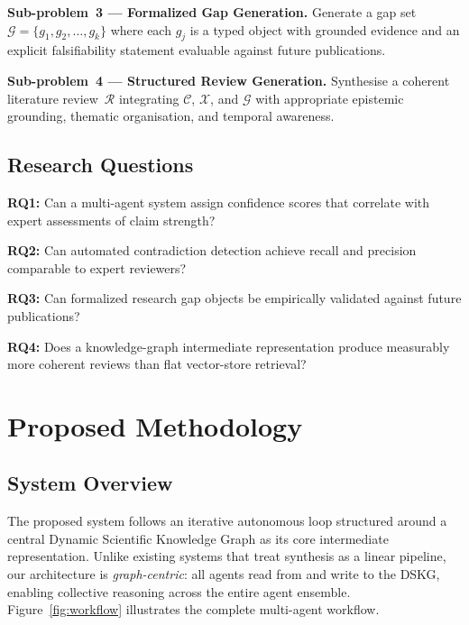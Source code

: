 \documentclass{llncs}
\begin{document}
\textbf{Sub-problem~3 — Formalized Gap Generation.}
Generate a gap set $\mathcal{G} = \{g_1, g_2, \ldots, g_k\}$ where each
$g_j$ is a typed object with grounded evidence and an explicit
falsifiability statement evaluable against future publications.

\textbf{Sub-problem~4 — Structured Review Generation.}
Synthesise a coherent literature review~$\mathcal{R}$ integrating $\mathcal{C}$,
$\mathcal{X}$, and $\mathcal{G}$ with appropriate epistemic grounding, thematic
organisation, and temporal awareness.

\subsection{Research Questions}

\textbf{RQ1:} Can a multi-agent system assign confidence scores that correlate
with expert assessments of claim strength?

\textbf{RQ2:} Can automated contradiction detection achieve recall and precision
comparable to expert reviewers?

\textbf{RQ3:} Can formalized research gap objects be empirically validated
against future publications?

\textbf{RQ4:} Does a knowledge-graph intermediate representation produce
measurably more coherent reviews than flat vector-store retrieval?

\section{Proposed Methodology}
\label{sec:methodology}

\subsection{System Overview}

The proposed system follows an iterative autonomous loop structured around
a central Dynamic Scientific Knowledge Graph as its core intermediate
representation. Unlike existing systems that treat synthesis as a linear
pipeline, our architecture is \emph{graph-centric}: all agents read from and
write to the DSKG, enabling collective reasoning across the entire agent
ensemble. Figure~\ref{fig:workflow} illustrates the complete multi-agent
workflow.
\end{document}
